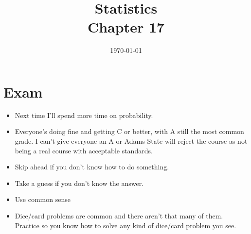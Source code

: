 \documentclass[letterpaper, landscape]{exam}
\title{Statistics \\ Chapter 17}
\date{\today}
\author{}
\begin{document}
  \maketitle
  \setcounter{tocdepth}{2}
  \tableofcontents

  \section{Exam} %
  
  \begin{itemize}
    \item Next time I'll spend more time on probability. 

    \item Everyone's doing fine and getting C or better, with A still the most
      common grade. I can't give everyone an A or Adams State will reject the
      course as not being a real course with acceptable standards.

    \item Skip ahead if you don't know how to do something.

    \item Take a guess if you don't know the answer.

    \item Use common sense

    \item Dice/card problems are common and there aren't that many of them. Practice
      so you know how to solve any kind of dice/card problem you see.


\end{itemize}
\end{document}
